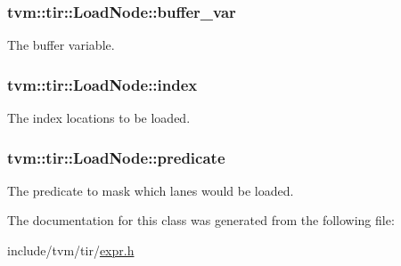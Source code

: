 \subsubsection[{\texorpdfstring{buffer\+\_\+var}{buffer_var}}]{ tvm\+::tir\+::\+Load\+Node\+::buffer\+\_\+var}\hypertarget{classtvm_1_1tir_1_1LoadNode_a2c69902eee069e824c822492068e6913}{}\label{classtvm_1_1tir_1_1LoadNode_a2c69902eee069e824c822492068e6913}


The buffer variable. 

\subsubsection[{\texorpdfstring{index}{index}}]{ tvm\+::tir\+::\+Load\+Node\+::index}\hypertarget{classtvm_1_1tir_1_1LoadNode_a0133c1a78c31b6eba24036a1f410cc1b}{}\label{classtvm_1_1tir_1_1LoadNode_a0133c1a78c31b6eba24036a1f410cc1b}


The index locations to be loaded. 

\subsubsection[{\texorpdfstring{predicate}{predicate}}]{ tvm\+::tir\+::\+Load\+Node\+::predicate}\hypertarget{classtvm_1_1tir_1_1LoadNode_af27e6b2dc6293dffaa93e992085be458}{}\label{classtvm_1_1tir_1_1LoadNode_af27e6b2dc6293dffaa93e992085be458}


The predicate to mask which lanes would be loaded. 



The documentation for this class was generated from the following file\+:\begin{DoxyCompactItemize}
\item 
include/tvm/tir/\hyperlink{tir_2expr_8h}{expr.\+h}\end{DoxyCompactItemize}
